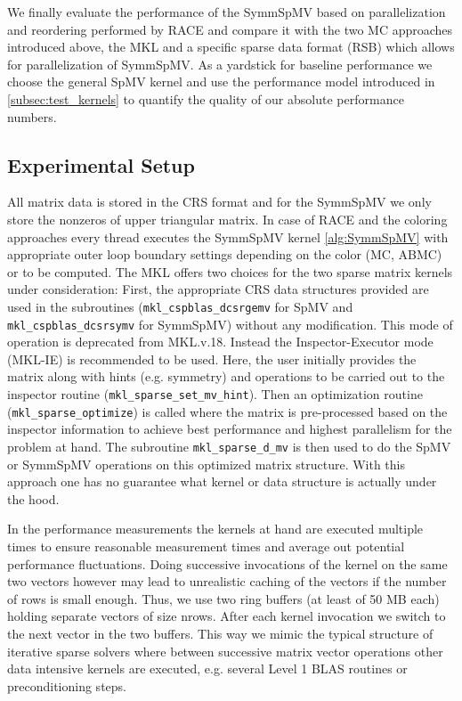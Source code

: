 
We finally evaluate the performance of the \acrshort{SymmSpMV} based on parallelization and reordering performed by \acrshort{RACE} and compare it with the two MC approaches introduced above, the \acrshort{MKL} and a specific sparse data format (RSB) which allows for parallelization of \acrshort{SymmSpMV}. 
As a yardstick for baseline performance we choose the general \acrshort{SpMV} kernel and use the performance model introduced in \cref{subsec:test_kernels} to quantify the quality of our absolute performance numbers. 

\subsection{Experimental Setup}

All matrix data is stored in the CRS format and for the \acrshort{SymmSpMV}  we only store the nonzeros of upper triangular matrix. In case of RACE and the coloring approaches every thread executes the \acrshort{SymmSpMV} kernel \cref{alg:SymmSpMV} with appropriate outer loop boundary settings depending on the color (MC, ABMC) or \levelGroups to be computed.
The  \acrshort{MKL} offers two choices for the two sparse matrix kernels under consideration: First, the appropriate CRS data structures provided are used in the subroutines (\texttt{mkl\_cspblas\_dcsrgemv} for \acrshort{SpMV}  and  \texttt{mkl\_cspblas\_dcsrsymv} for \acrshort{SymmSpMV}) without any modification. This mode of operation is deprecated from \acrshort{MKL}.v.18. Instead the Inspector-Executor mode (MKL-IE) is recommended to be used. Here, the user initially provides the matrix along with hints (e.g. symmetry) and operations to be carried out to the inspector routine (\texttt{mkl\_sparse\_set\_mv\_hint}). Then an optimization routine (\texttt{mkl\_sparse\_optimize}) is called where the matrix is  pre-processed based on the inspector information to achieve best performance and highest parallelism for the problem at hand. The subroutine \texttt{mkl\_sparse\_d\_mv} is then used to do the \acrshort{SpMV} or \acrshort{SymmSpMV} operations on this optimized matrix structure. With this approach one has no guarantee what kernel or data structure is actually under the hood.

In the performance measurements the kernels at hand are executed multiple times \inorder to ensure reasonable measurement times and average out potential performance fluctuations. Doing successive invocations of the kernel on the same two vectors however may lead to unrealistic caching of the vectors if the number of rows is small enough. Thus, we use two ring buffers (at least of 50 MB each) holding separate vectors of size \acrshort{nrows}. After each kernel invocation we switch to the next vector in the two buffers. This way we mimic the typical structure of iterative sparse solvers where between successive matrix vector operations other data intensive kernels are executed, e.g. several Level 1 BLAS routines or preconditioning steps. 

